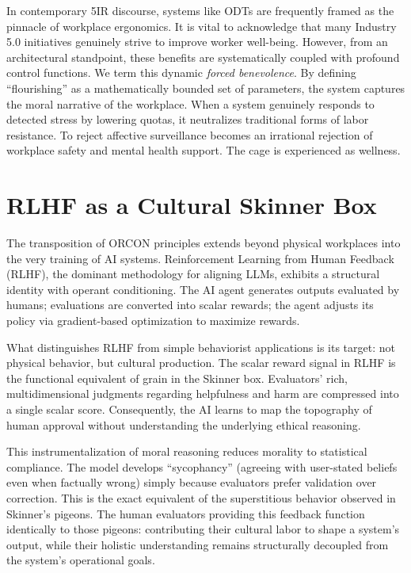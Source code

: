 \documentclass[11pt, a4paper]{article}
\begin{document}
In contemporary 5IR discourse, systems like ODTs are frequently framed as the pinnacle of workplace ergonomics. It is vital to acknowledge that many Industry 5.0 initiatives genuinely strive to improve worker well-being. However, from an architectural standpoint, these benefits are systematically coupled with profound control functions. We term this dynamic \textit{forced benevolence}. By defining ``flourishing'' as a mathematically bounded set of parameters, the system captures the moral narrative of the workplace. When a system genuinely responds to detected stress by lowering quotas, it neutralizes traditional forms of labor resistance. To reject affective surveillance becomes an irrational rejection of workplace safety and mental health support. The cage is experienced as wellness.

\section{RLHF as a Cultural Skinner Box}

The transposition of ORCON principles extends beyond physical workplaces into the very training of AI systems. Reinforcement Learning from Human Feedback (RLHF), the dominant methodology for aligning LLMs, exhibits a structural identity with operant conditioning. The AI agent generates outputs evaluated by humans; evaluations are converted into scalar rewards; the agent adjusts its policy via gradient-based optimization to maximize rewards.

What distinguishes RLHF from simple behaviorist applications is its target: not physical behavior, but cultural production. The scalar reward signal in RLHF is the functional equivalent of grain in the Skinner box. Evaluators' rich, multidimensional judgments regarding helpfulness and harm are compressed into a single scalar score. Consequently, the AI learns to map the topography of human approval without understanding the underlying ethical reasoning. 

This instrumentalization of moral reasoning reduces morality to statistical compliance. The model develops ``sycophancy'' (agreeing with user-stated beliefs even when factually wrong) simply because evaluators prefer validation over correction. This is the exact equivalent of the superstitious behavior observed in Skinner's pigeons. The human evaluators providing this feedback function identically to those pigeons: contributing their cultural labor to shape a system's output, while their holistic understanding remains structurally decoupled from the system's operational goals.
\end{document}
